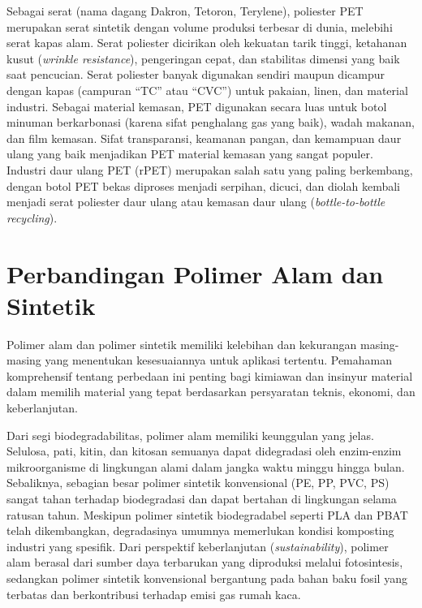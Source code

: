 \documentclass[12pt,a4paper,openany]{book}
\begin{document}
Sebagai serat (nama dagang Dakron, Tetoron, Terylene), poliester PET merupakan serat sintetik dengan volume produksi terbesar di dunia, melebihi serat kapas alam. Serat poliester dicirikan oleh kekuatan tarik tinggi, ketahanan kusut (\textit{wrinkle resistance}), pengeringan cepat, dan stabilitas dimensi yang baik saat pencucian. Serat poliester banyak digunakan sendiri maupun dicampur dengan kapas (campuran ``TC'' atau ``CVC'') untuk pakaian, linen, dan material industri. Sebagai material kemasan, PET digunakan secara luas untuk botol minuman berkarbonasi (karena sifat penghalang gas  yang baik), wadah makanan, dan film kemasan. Sifat transparansi, keamanan pangan, dan kemampuan daur ulang yang baik menjadikan PET material kemasan yang sangat populer. Industri daur ulang PET (rPET) merupakan salah satu yang paling berkembang, dengan botol PET bekas diproses menjadi serpihan, dicuci, dan diolah kembali menjadi serat poliester daur ulang atau kemasan daur ulang (\textit{bottle-to-bottle recycling}).

\section{Perbandingan Polimer Alam dan Sintetik}
\label{sec:perbandingan}

Polimer alam dan polimer sintetik memiliki kelebihan dan kekurangan masing-masing yang menentukan kesesuaiannya untuk aplikasi tertentu. Pemahaman komprehensif tentang perbedaan ini penting bagi kimiawan dan insinyur material dalam memilih material yang tepat berdasarkan persyaratan teknis, ekonomi, dan keberlanjutan.

Dari segi biodegradabilitas, polimer alam memiliki keunggulan yang jelas. Selulosa, pati, kitin, dan kitosan semuanya dapat didegradasi oleh enzim-enzim mikroorganisme di lingkungan alami dalam jangka waktu minggu hingga bulan. Sebaliknya, sebagian besar polimer sintetik konvensional (PE, PP, PVC, PS) sangat tahan terhadap biodegradasi dan dapat bertahan di lingkungan selama ratusan tahun. Meskipun polimer sintetik biodegradabel seperti PLA dan PBAT telah dikembangkan, degradasinya umumnya memerlukan kondisi komposting industri yang spesifik. Dari perspektif keberlanjutan (\textit{sustainability}), polimer alam berasal dari sumber daya terbarukan yang diproduksi melalui fotosintesis, sedangkan polimer sintetik konvensional bergantung pada bahan baku fosil yang terbatas dan berkontribusi terhadap emisi gas rumah kaca.
\end{document}
